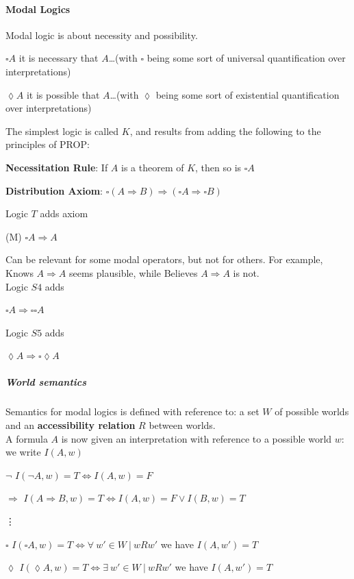 \documentclass[10pt]{report}
\begin{document}
\paragraph{Modal Logics} Modal logic is about necessity and possibility.
\begin{list}{}{}
	\item $\square A$ it is necessary that $A$\ldots (with $\square$ being some sort of universal quantification over interpretations)
	\item $\lozenge A$ it is possible that $A$\ldots (with $\lozenge$ being some sort of existential quantification over interpretations)
\end{list}
The simplest logic is called $K$, and results from adding the following to the principles of PROP:
\begin{list}{}{}
	\item \textbf{Necessitation Rule}: If $A$ is a theorem of $K$, then so is $\square A$
	\item \textbf{Distribution Axiom}: $\square (A\Rightarrow B) \Rightarrow (\square A \Rightarrow \square B)$
\end{list}
Logic $T$ adds axiom
\begin{list}{}{}
	\item[(M)] $\square A \Rightarrow A$
\end{list}
Can be relevant for some modal operators, but not for others. For example, Knows $A\Rightarrow A$ seems plausible, while Believes $A\Rightarrow A$ is not.\\
Logic $S4$ adds
\begin{list}{}{}
	\item $\square A \Rightarrow \square \square A$
\end{list}
Logic $S5$ adds
\begin{list}{}{}
	\item $\lozenge A \Rightarrow \square\lozenge A$
\end{list}
\subparagraph{World semantics} Semantics for modal logics is defined with reference to: a set $W$ of possible worlds and an \textbf{accessibility relation} $R$ between worlds.\\
A formula $A$ is now given an interpretation with reference to a possible world $w$: we write $I(A, w)$
\begin{list}{}{}
	\item[$\neg$] $I(\neg A, w)= T \Leftrightarrow I(A, w) = F$
	\item[$\Rightarrow$] $I(A\Rightarrow B, w)= T \Leftrightarrow I(A, w) = F\vee I(B, w) = T$
	\item[\vdots]
	\item[$\square$] $I(\square A, w)= T \Leftrightarrow\forall\:w'\in W\:|\: wRw'$ we have $I(A, w') = T$
	\item[$\lozenge$] $I(\lozenge A, w)= T \Leftrightarrow\exists\:w'\in W\:|\: wRw'$ we have $I(A, w') = T$
\end{list}
\end{document}
